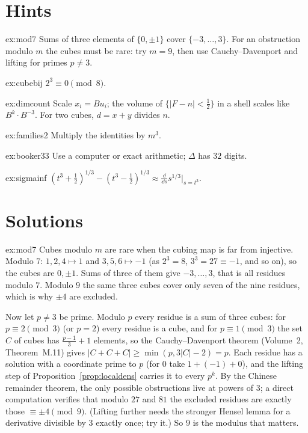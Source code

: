 \section{Hints}

\begin{hint}{ex:mod7}
Sums of three elements of $\{0,\pm1\}$ cover $\{-3,\dots,3\}$. For an obstruction modulo $m$ the cubes must be rare: try $m=9$, then use Cauchy--Davenport and lifting for primes $p\ne3$.
\end{hint}

\begin{hint}{ex:cubebij}
$2^3\equiv0\pmod8$.
\end{hint}

\begin{hint}{ex:dimcount}
Scale $x_i=Bu_i$; the volume of $\{|F-n|<\frac12\}$ in a shell scales like $B^{k}\cdot B^{-3}$. For two cubes, $d=x+y$ divides $n$.
\end{hint}

\begin{hint}{ex:families2}
Multiply the identities by $m^3$.
\end{hint}

\begin{hint}{ex:booker33}
Use a computer or exact arithmetic; $\Delta$ has $32$ digits.
\end{hint}

\begin{hint}{ex:sigmainf}
$(t^3+\frac12)^{1/3}-(t^3-\frac12)^{1/3}\approx\frac{\dd}{\dd s}s^{1/3}\big|_{s=t^3}$.
\end{hint}

\section{Solutions}

\begin{solution}{ex:mod7}
\idea Cubes modulo $m$ are rare when the cubing map is far from injective.
\writeup Modulo $7$: $1,2,4\mapsto1$ and $3,5,6\mapsto-1$ (as $2^3=8$, $3^3=27\equiv-1$, and so on), so the cubes are $0,\pm1$. Sums of three of them give $-3,\dots,3$, that is all residues modulo $7$. Modulo $9$ the same
three cubes cover only seven of the nine residues, which is why $\pm4$ are excluded.

Now let $p\ne3$ be prime. Modulo $p$ every residue is a sum of three cubes: for $p\equiv2\pmod3$ (or $p=2$) every residue is a cube, and for $p\equiv1\pmod3$ the set $C$ of cubes has $\frac{p-1}3+1$ elements, so the Cauchy--Davenport theorem (Volume~2, Theorem~M.11) gives $|C+C+C|\ge\min(p,3|C|-2)=p$. Each residue has a solution with a coordinate prime to $p$ (for $0$ take $1+(-1)+0$), and the lifting step of Proposition~\ref{prop:localdens} carries it to every $p^k$. By the Chinese remainder theorem, the only possible obstructions live at powers of $3$; a direct computation verifies that modulo $27$ and $81$ the excluded residues are exactly those $\equiv\pm4\pmod9$. (Lifting further needs the stronger Hensel lemma for a derivative divisible by $3$ exactly once; try it.) So $9$ is the modulus that matters.
\end{solution}

